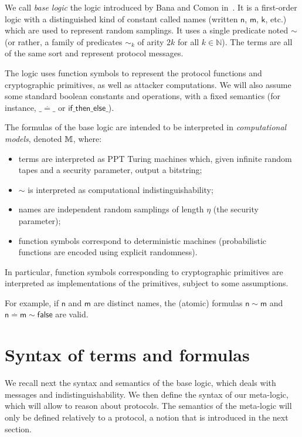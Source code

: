 We call \emph{base logic} the logic introduced by Bana and Comon in~\cite{Bana:2014:CCS:2660267.2660276}.
It is a first-order logic with a distinguished kind of constant called names (written $\mathsf{n}$, $\mathsf{m}$, $\mathsf{k}$, etc.) which are used to represent random samplings. It uses a single predicate noted $\sim$ (or rather, a family
of predicates $\sim_k$ of arity $2 k$ for all $k\in\mathbb{N}$).
The terms are all of the same sort and represent protocol messages.

The logic uses function symbols to represent the protocol functions and cryptographic primitives, as well as attacker computations.
We will also assume some standard boolean constants and operations, with
a fixed semantics (for instance, $\_ \stackrel{.}{=} \_$ or
$\mathsf{if \_ then \_ else \_}$).

The formulas of the base logic are intended to be interpreted in
\emph{computational models}, denoted $\mathbb{M}$, where:
\begin{itemize}
  \item terms are interpreted as PPT Turing machines which,
    given infinite random tapes and a security parameter, output a bitstring;
  \item $\sim$ is interpreted as computational indistinguishability;
  \item names are independent random samplings of length $\eta$ (the security parameter);
  \item function symbols correspond to deterministic machines (probabilistic functions are encoded using explicit randomness).
\end{itemize}

In particular, function symbols corresponding to cryptographic primitives
are interpreted as implementations of the primitives, subject to some
assumptions.

For example, if $\mathsf{n}$ and $\mathsf{m}$ are distinct names,
the (atomic) formulas $\mathsf{n}\sim\mathsf{m}$ and
$\mathsf{n}\stackrel{.}{=}\mathsf{m}\sim\mathsf{false}$
are valid.

\section{Syntax of terms and formulas}

We recall next the syntax and semantics of the base logic, which deals with
messages and indistinguishability.
We then define the syntax of our meta-logic, which will allow to reason about
protocols. The semantics of the meta-logic will only be defined relatively to a
protocol, a notion that is introduced in the next section.

